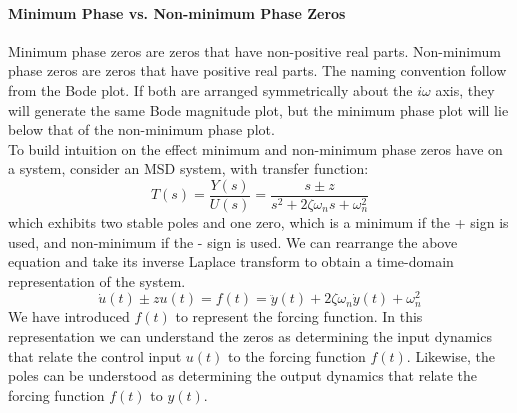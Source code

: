 \documentclass[../notes.tex]{subfiles}
\begin{document}
\paragraph{Minimum Phase vs. Non-minimum Phase Zeros}
Minimum phase zeros are zeros that have non-positive real parts. Non-minimum phase zeros are zeros that have positive real parts. The naming convention follow from the Bode plot. If both are arranged symmetrically about the $i\omega$ axis, they will generate the same Bode magnitude plot, but the minimum phase plot will lie below that of the non-minimum phase plot. \\
To build intuition on the effect minimum and non-minimum phase zeros have on a system, consider an MSD system, with transfer function:
\begin{equation*}
    T(s) = \frac{Y(s)}{U(s)} = \frac{s \pm z}{s^2 + 2\zeta \omega_n s + \omega_n^2}
\end{equation*}
which exhibits two stable poles and one zero, which is a minimum if the + sign is used, and non-minimum if the - sign is used. We can rearrange the above equation and take its inverse Laplace transform to obtain a time-domain representation of the system.
\begin{equation*}
    \dot{u}(t) \pm zu(t) = f(t) = \ddot{y}(t) + 2\zeta\omega_n\dot{y}(t) + \omega_n^2
\end{equation*}
We have introduced $f(t)$ to represent the forcing function. In this representation we can understand the zeros as determining the input dynamics that relate the control input $u(t)$ to the forcing function $f(t)$. Likewise, the poles can be understood as determining the output dynamics that relate the forcing function $f(t)$ to $y(t)$.
\end{document}
